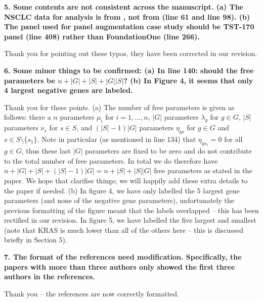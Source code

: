 \documentclass[12pt]{article}
\begin{document}
\textbf{5. Some contents are not consistent across the manuscript.
(a) The NSCLC data for analysis is from \citet{campbell_distinct_2016}, not from \citet{chalmers_analysis_2017} (line 61 and line 98).
(b) The panel used for panel augmentation case study should be TST-170 panel (line 408) rather than FoundationOne (line 266).}

Thank you for pointing out these typos, they have been corrected in our revision. 

\textbf{6. Some minor things to be confirmed:
(a) In line 140: should the free parameters be $n + |G| + |S| + |G||S|$?
(b) In Figure 4, it seems that only 4 largest negative genes are labeled.}

Thank you for these points. (a) The number of free parameters is given as follows: there a $n$ parameters $\mu_i$ for $i = 1, \ldots, n$, $|G|$ parameters $\lambda_g$ for $g \in G$, $|S|$ parameters $\nu_s$ for $s \in S$, and $(|S| - 1) |G|$ parameters $\eta_{gs}$ for $g \in G$ and $s \in S \setminus \{s_1\}$. Note in particular (as mentioned in line 134) that $\eta_{gs_1} = 0$ for all $g \in G$, thus these last $|G|$ parameters are fixed to be zero and do not contribute to the total number of free parameters. In total we do therefore have $n + |G| + |S| + (|S|-1)|G| = n + |S| + |S||G|$ free parameters as stated in the paper.  We hope that clarifies things; we will happily add these extra details to the paper if needed. (b) In figure 4, we have only labelled the 5 largest gene parameters (and none of the negative gene parameters), unfortunately the previous formatting of the figure meant that the labels overlapped -- this has been rectified in our revision. In figure 5, we have labelled the five largest and smallest (note that KRAS is much lower than all of the others here -- this is discussed briefly in Section 5). 

\textbf{7. The format of the references need modification. Specifically, the papers with more than three authors only showed the first three authors in the references.}

Thank you -- the references are now correctly formatted. 
\end{document}
